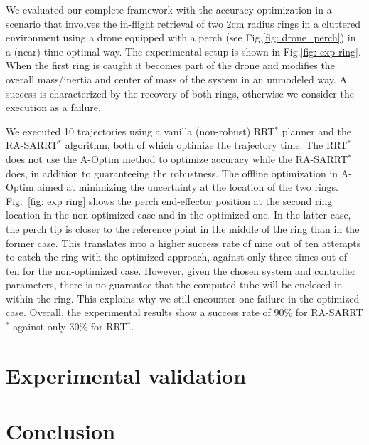 We evaluated our complete framework with the accuracy optimization in a scenario that involves the in-flight retrieval of two 2cm radius rings in a cluttered environment using a drone equipped with a perch (see Fig.\ref{fig: drone_perch}) in a (near) time optimal way.
The experimental setup is shown in Fig.\ref{fig: exp ring}.
When the first ring is caught it becomes part of the drone and modifies the overall mass/inertia and center of mass of the system in an unmodeled way. 
A success is characterized by the recovery of both rings, otherwise we consider the execution as a failure.

We executed 10 trajectories using a vanilla (non-robust) RRT$^*$ planner and the RA-SARRT$^*$ algorithm, both of which optimize the trajectory time.
The RRT$^*$ does not use the A-Optim method to optimize accuracy while the RA-SARRT$^*$ does, in addition to guaranteeing the robustness.
The offline optimization in A-Optim aimed at minimizing the uncertainty at the location of the two rings.
Fig.~\ref{fig: exp ring} shows the perch end-effector position at the second ring location in the non-optimized case and in the optimized one. 
In the latter case, the perch tip is closer to the reference point in the middle of the ring than in the former case. This translates into a higher success rate of nine out of ten attempts to catch the ring with the optimized approach, against only three times out of ten for the non-optimized case.
However, given the chosen system and controller parameters, there is no guarantee that the computed tube will be enclosed in within the ring.
This explains why we still encounter one failure in the optimized case.
Overall, the experimental results show a success rate of 90\% for RA-SARRT$^*$ against only 30\% for RRT$^*$.

\section{Experimental validation} \label{sec:Experimental}

\section{Conclusion} \label{sec:Conclusion}


